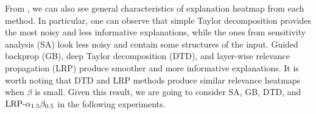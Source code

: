From \addfigure{\ref{fig:lenet_heatmaps}}, we can also see general characteristics of explanation heatmap from each method. In particular, one can observe that simple Taylor decomposition provides the most noisy and less informative explanations, while the ones from sensitivity analysis (SA)  look less noisy and contain some structures of the input. Guided backprop (GB), deep Taylor decomposition (DTD), and layer-wise relevance propagation (LRP) produce smoother and more informative explanations. It is worth noting that DTD and LRP methods produce similar relevance heatmaps when $\beta$ is small. Given this result, we are going to consider SA, GB, DTD, and $\text{LRP-}\alpha_{1.5}\beta_{0.5}$ in the following experiments.